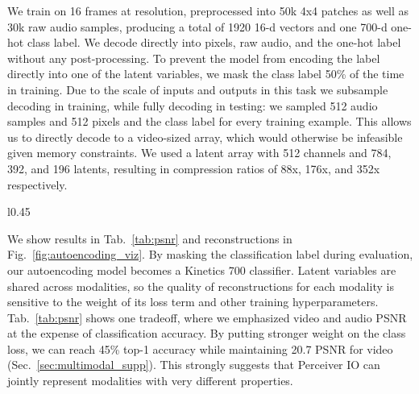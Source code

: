 \documentclass{article} \usepackage{iclr2022_conference,times}
\newcommand{\ourmodel}{Perceiver IO\xspace}
\begin{document}
We train on 16 frames at  resolution, preprocessed into 50k 4x4 patches as well as 30k raw audio samples, producing a total of 1920 16-d vectors and one 700-d one-hot class label. We decode directly into pixels, raw audio, and the one-hot label without any post-processing.
To prevent the model from encoding the label directly into one of the latent variables, we mask the class label 50\% of the time in training. Due to the scale of inputs and outputs in this task we subsample decoding in training, while fully decoding in testing: we sampled 512 audio samples and 512 pixels and the class label for every training example. This allows us to directly decode to a video-sized array, which would otherwise be infeasible given memory constraints. We used a latent array with 512 channels and 784, 392, and 196 latents, resulting in compression ratios of 88x, 176x, and 352x respectively. 

\begin{wraptable}{l}{0.45\linewidth}
        \centering
    \caption{\small Multimodal autoencoding results. Higher is better for accuracy and PSNR.}
    \label{tab:psnr}
    \vspace{-10pt}
\end{wraptable}

We show results in Tab.~\ref{tab:psnr} and reconstructions in Fig.~\ref{fig:autoencoding_viz}.
By masking the classification label during evaluation, our autoencoding model becomes a Kinetics 700 classifier. Latent variables are shared across modalities, so the quality of reconstructions for each modality is sensitive to the weight of its loss term and other training hyperparameters.
Tab.~\ref{tab:psnr} shows one tradeoff, where we emphasized video and audio PSNR
at the expense of classification accuracy.
By putting stronger weight on the class loss,
we can reach 45\% top-1 accuracy while maintaining 20.7 PSNR for video (Sec.~\ref{sec:multimodal_supp}). This strongly suggests that \ourmodel{} can jointly represent modalities with very different properties. 
\end{document}
